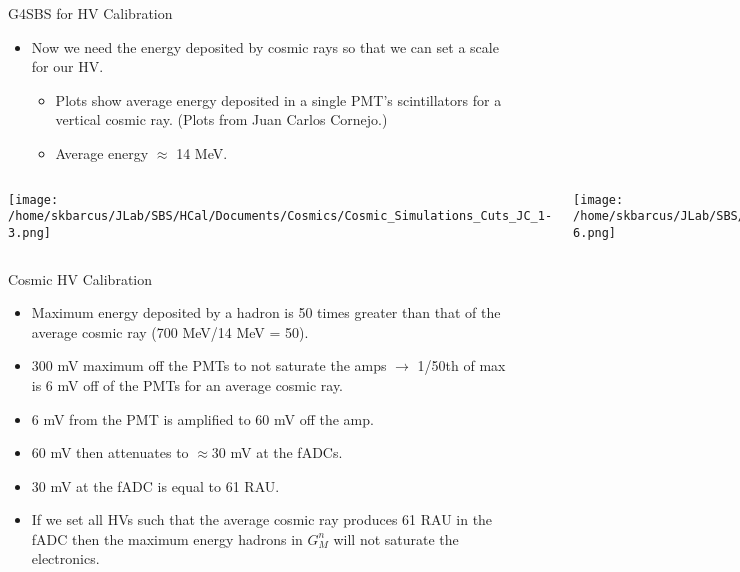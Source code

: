 \documentclass[10pt]{beamer}
\begin{document}
\begin{frame}{G4SBS for HV Calibration}

	\begin{itemize}
		\item Now we need the energy deposited by cosmic rays so that we can set a scale for our HV.
		\begin{itemize}
			\item[--] Plots show average energy deposited in a single PMT's scintillators for a vertical cosmic ray. (Plots from Juan Carlos Cornejo.)
			\item[--] Average energy $\approx$ 14 MeV.
		\end{itemize}
	\end{itemize}

    \begin{columns}[T,onlytextwidth]
	
	\vspace{-5mm}
	\begin{center}
	\texttt{[image: /home/skbarcus/JLab/SBS/HCal/Documents/Cosmics/Cosmic\_Simulations\_Cuts\_JC\_1-3.png]}
	\end{center}
	
	
	\vspace{-5mm}
	\begin{center}
	\texttt{[image: /home/skbarcus/JLab/SBS/HCal/Documents/Cosmics/Cosmic\_Simulations\_Cuts\_JC\_4-6.png]}
	\end{center}
	
	\end{columns}

\end{frame}

\begin{frame}{Cosmic HV Calibration}

	\begin{itemize}
		\item Maximum energy deposited by a hadron is 50 times greater than that of the average cosmic ray (700 MeV/14 MeV = 50).
		\item 300 mV maximum off the PMTs to not saturate the amps $\rightarrow$ 1/50th of max is 6 mV off of the PMTs for an average cosmic ray.
		\item 6 mV from the PMT is amplified to 60 mV off the amp.
		\item 60 mV then attenuates to $\approx$30 mV at the fADCs.
		\item 30 mV at the fADC is equal to 61 RAU.
		\item If we set all HVs such that the average cosmic ray produces 61 RAU in the fADC then the maximum energy hadrons in $G_M^n$ will not saturate the electronics.
	\end{itemize}

\end{frame}
\end{document}
